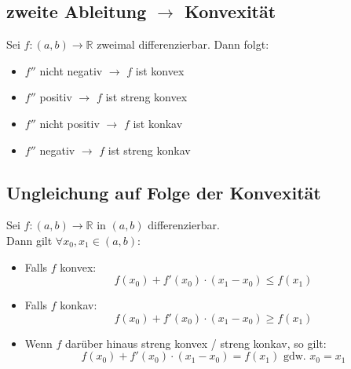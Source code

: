\documentclass[halfparscip]{scrartcl}
\newcounter{subsection2}
\begin{document}
\subsection{zweite Ableitung $\rightarrow$ Konvexität}
Sei $f : (a,b) \rightarrow \mathbb{R}$ zweimal differenzierbar. Dann folgt:
\begin{itemize}
	\item $f''$ nicht negativ $\rightarrow$ $f$ ist konvex
	\item $f''$ positiv $\rightarrow$ $f$ ist streng konvex
	\item $f''$ nicht positiv $\rightarrow$ $f$ ist konkav
	\item $f''$ negativ $\rightarrow$ $f$ ist streng konkav
\end{itemize}

\subsection{Ungleichung auf Folge der Konvexität}
Sei $f : (a,b) \rightarrow \mathbb{R}$ in $(a,b)$ differenzierbar. \\
Dann gilt $\forall x_0, x_1 \in (a,b)$:
\begin{itemize}
	\item Falls $f$ konvex:
	\begin{equation*}
	f(x_0) + f'(x_0) \cdot (x_1 - x_0) \leq f(x_1)
	\end{equation*}
	\item Falls $f$ konkav:
	\begin{equation*}
	f(x_0) + f'(x_0) \cdot (x_1 - x_0) \geq f(x_1)
	\end{equation*}
	\item Wenn $f$ darüber hinaus streng konvex / streng konkav, so gilt:
	\begin{equation*}
	f(x_0) + f'(x_0) \cdot (x_1 - x_0) = f(x_1) \text{ gdw. } x_0 = x_1
	\end{equation*}
	
\end{itemize}
\end{document}
